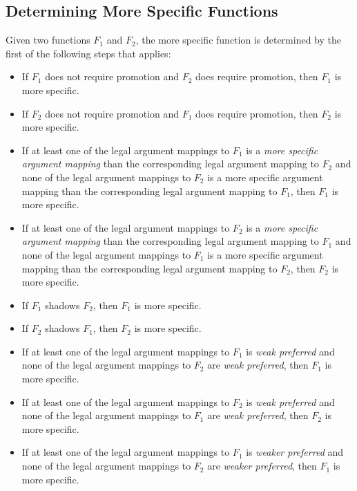 \subsection{Determining More Specific Functions}
\label{Determining_More_Specific_Functions}

Given two functions $F_1$ and $F_2$, the more specific function is
determined by the first of the following steps that applies:

\begin{itemize}
\item If $F_1$ does not require promotion and $F_2$ does require promotion, then $F_1$ is more specific.
\item If $F_2$ does not require promotion and $F_1$ does require promotion, then $F_2$ is more specific.
\item
If at least one of the legal argument mappings to $F_1$ is a {\em more
specific argument mapping} than the corresponding legal argument
mapping to $F_2$ and none of the legal argument mappings to $F_2$ is a
more specific argument mapping than the corresponding legal argument
mapping to $F_1$, then $F_1$ is more specific.

\item
If at least one of the legal argument mappings to $F_2$ is a {\em more
specific argument mapping} than the corresponding legal argument
mapping to $F_1$ and none of the legal argument mappings to $F_1$ is a
more specific argument mapping than the corresponding legal argument
mapping to $F_2$, then $F_2$ is more specific.


\item If $F_1$ shadows $F_2$, then $F_1$ is more specific.
\item If $F_2$ shadows $F_1$, then $F_2$ is more specific.

\item If at least one of the legal argument mappings to $F_1$ is {\em
weak preferred} and none of the legal argument mappings to $F_2$ are {\em weak
preferred}, then $F_1$ is more specific.

\item If at least one of the legal argument mappings to $F_2$ is {\em
weak preferred} and none of the legal argument mappings to $F_1$ are {\em weak
preferred}, then $F_2$ is more specific.

\item If at least one of the legal argument mappings to $F_1$ is {\em
weaker preferred} and none of the legal argument mappings to $F_2$ are
{\em weaker preferred}, then $F_1$ is more specific.


\end{itemize}
